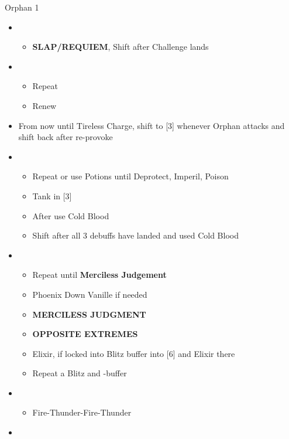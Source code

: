 \begin{battle}[2:55]{Orphan 1}
\begin{multicols}{2}
\begin{itemize}
\begin{itemize}
            \end{itemize}
      \item \third
            \begin{itemize}
              \item \textbf{SLAP/REQUIEM}, Shift after Challenge lands
            \end{itemize}
      \item \fifth
            \begin{itemize}
              \item Repeat
              \item Renew
            \end{itemize}
            \vfill\null
            \columnbreak
      \item From now until Tireless Charge, shift to [3] whenever Orphan attacks and shift back after re-provoke
      \item \fifth
            \begin{itemize}
              \item Repeat or use Potions until Deprotect, Imperil, Poison
              \item Tank in [3]
              \item After \stagger use Cold Blood
              \item Shift after all 3 debuffs have landed and used Cold Blood
            \end{itemize}
      \item \first
            \begin{itemize}
              \item Repeat until \textbf{Merciless Judgement}
              \item Phoenix Down Vanille if needed
              \item \textbf{MERCILESS JUDGMENT}
              \item \textbf{OPPOSITE EXTREMES}
              \item Elixir, if locked into Blitz buffer into [6] and Elixir there
              \item Repeat a Blitz and \rav-buffer
            \end{itemize}
      \item \sixth
            \begin{itemize}
              \item Fire-Thunder-Fire-Thunder
            \end{itemize}
      \item \fourth
            \begin{itemize}

\end{itemize}
\end{itemize}
\end{multicols}
\end{battle}
